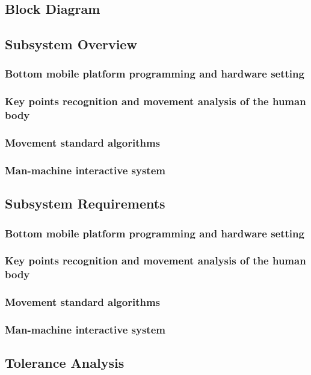 \subsection{Block Diagram}

\subsection{Subsystem Overview}

\subsubsection{Bottom mobile platform programming and hardware setting}

\subsubsection{Key points recognition and movement analysis of the human body}

\subsubsection{Movement standard algorithms}

\subsubsection{Man-machine interactive system}

\subsection{Subsystem Requirements}

\subsubsection{Bottom mobile platform programming and hardware setting}

\subsubsection{Key points recognition and movement analysis of the human body}

\subsubsection{Movement standard algorithms}

\subsubsection{Man-machine interactive system}

\subsection{Tolerance Analysis}